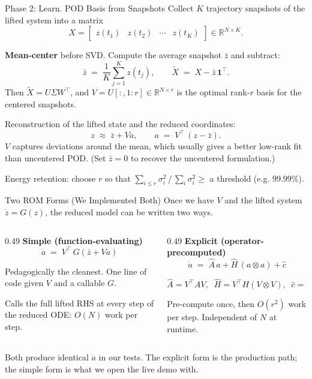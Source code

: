 \documentclass[aspectratio=169,10pt]{beamer}
\begin{document}

\begin{frame}{Phase 2: Learn. POD Basis from Snapshots}
  Collect $K$ trajectory snapshots of the lifted system into a matrix
  \[
    X = \begin{bmatrix} z(t_1) & z(t_2) & \cdots & z(t_K) \end{bmatrix} \in \mathbb{R}^{N \times K}.
  \]

  \medskip
  \textbf{Mean-center} before SVD. Compute the average snapshot $\bar{z}$ and subtract:
  \[
    \bar{z} \;=\; \frac{1}{K}\sum_{j=1}^{K} z(t_j),
    \qquad
    \widetilde{X} \;=\; X - \bar{z}\,\mathbf{1}^{\top}.
  \]
  Then $\widetilde{X} = U\Sigma W^{\top}$, and $V = U[:, 1{:}r] \in \mathbb{R}^{N \times r}$ is the optimal rank-$r$ basis for the centered snapshots.

  \medskip
  Reconstruction of the lifted state and the reduced coordinates:
  \[
    z \;\approx\; \bar{z} + V a,
    \qquad
    a \;=\; V^{\top}\,(z - \bar{z}).
  \]
  $V$ captures deviations around the mean, which usually gives a better low-rank fit than uncentered POD. (Set $\bar{z} = 0$ to recover the uncentered formulation.)

  \medskip
  Energy retention: choose $r$ so that $\sum_{i \leq r} \sigma_i^2 \,/\, \sum_i \sigma_i^2 \geq $ a threshold (e.g. $99.99\%$).
\end{frame}

\begin{frame}{Two ROM Forms (We Implemented Both)}
  Once we have $V$ and the lifted system $\dot{z} = G(z)$, the reduced model can be written two ways.

  \begin{columns}[T]
    \begin{column}{0.49\textwidth}
      \textbf{Simple (function-evaluating)}
      \[
        \dot{a} \;=\; V^{\top}\, G(\bar{z} + V a)
      \]

      \medskip
      Pedagogically the cleanest. One line of code given $V$ and a callable $G$.

      \medskip
      Calls the full lifted RHS at every step of the reduced ODE: $O(N)$ work per step.
    \end{column}
    \begin{column}{0.49\textwidth}
      \textbf{Explicit (operator-precomputed)}
      \[
        \dot{a} \;=\; \widehat{A}\, a + \widehat{H}\, (a \otimes a) + \widehat{c}
      \]

      \medskip
      \[
        \widehat{A} = V^{\top} A V,\;\; \widehat{H} = V^{\top} H (V \otimes V),\;\; \widehat{c} = V^{\top} c
      \]

      \medskip
      Pre-compute once, then $O(r^2)$ work per step. Independent of $N$ at runtime.
    \end{column}
  \end{columns}

  \medskip
  Both produce identical $\dot{a}$ in our tests. The explicit form is the production path; the simple form is what we open the live demo with.
\end{frame}
\end{document}
